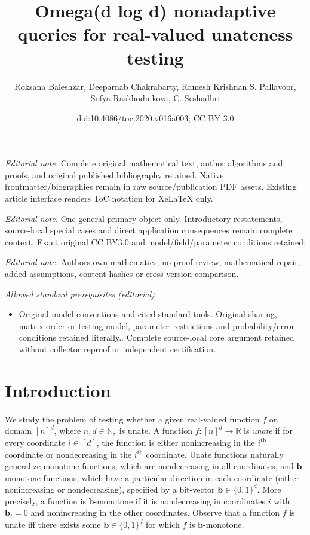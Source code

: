 \documentclass[11pt]{article}
\title{Omega(d log d) nonadaptive queries for real-valued unateness testing}
\author{Roksana Baleshzar, Deeparnab Chakrabarty, Ramesh Krishnan S. Pallavoor, Sofya Raskhodnikova, C. Seshadhri}
\date{doi:10.4086/toc.2020.v016a003; CC BY 3.0}
\numberwithin{equation}{section}
\theoremstyle{definition}
\theoremstyle{plain}
\newcommand{\R}{\mathbb R}
\newcommand{\N}{\mathbb N}
\newcommand{\ord}[2][th]{\ensuremath{{#2}^{\mathrm{#1}}}}
\newcommand{\bb}{\ensuremath{\mathbf{b}}}
\begin{document}
\maketitle
\noindent\textit{Editorial note.} Complete original mathematical text, author algorithms and proofs, and original published bibliography retained. Native frontmatter/biographies remain in raw source/publication PDF assets. Existing article interface renders ToC notation for XeLaTeX only.\par\medskip
\noindent\textit{Editorial note.} One general primary object only. Introductory restatements, source-local special cases and direct application consequences remain complete context. Exact original CC BY3.0 and model/field/parameter conditions retained.\par\medskip
\noindent\textit{Editorial note.} Authors own mathematics; no proof review, mathematical repair, added assumptions, content hashes or cross-version comparison.\par\medskip
\noindent\textit{Allowed standard prerequisites (editorial).}\begin{itemize}
\item Original model conventions and cited standard tools. Original sharing, matrix-order or testing model, parameter restrictions and probability/error conditions retained literally.. Complete source-local core argument retained without collector reproof or independent certification.
\end{itemize}\medskip
\section{Introduction}
%
We study the problem of testing whether a given real-valued function $f$ on domain $[n]^d$, where $n,d\in\N,$ is unate.
A function
$f:[n]^d \to \R$
is \emph{unate} if for every coordinate $i\in [d]$, the function is either nonincreasing in the $\ord{i}$ coordinate or nondecreasing in the $\ord{i}$ coordinate.
Unate functions naturally generalize monotone functions, which are nondecreasing in all coordinates, and $\bb$-monotone functions, which have a particular direction in each coordinate (either nonincreasing or nondecreasing), specified by a bit-vector $\bb\in \{0,1\}^d$. More precisely,
%
 a function is $\bb$-monotone if it is nondecreasing in coordinates $i$ with $\bb_i = 0$ and nonincreasing in the other coordinates. Observe that a function $f$ is unate iff there exists some $\bb\in \{0,1\}^d$ for which $f$ is $\bb$-monotone.
\end{document}
